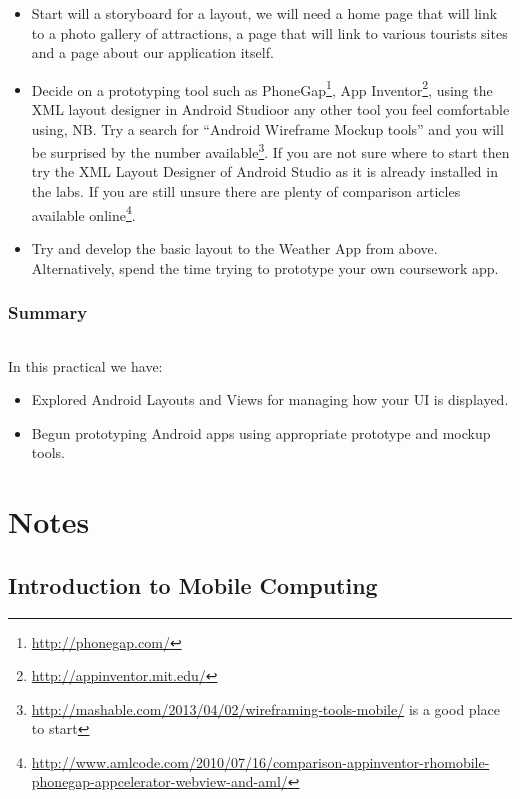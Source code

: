 \documentclass[12pt, a4paper, twoside]{book}
\begin{document}
\begin{itemize}
\item Start will a storyboard for a layout, we will need a home page that will link to a photo gallery of attractions, a page that will link to various tourists sites and a page about our application itself.
\item Decide on a prototyping tool such as PhoneGap\footnote{\url{http://phonegap.com/}}, App Inventor\footnote{\url{http://appinventor.mit.edu/}}, using the XML layout designer in Android Studioor any other tool you feel comfortable using, NB. Try a search for ``Android Wireframe Mockup tools'' and you will be surprised by the number available\footnote{\url{http://mashable.com/2013/04/02/wireframing-tools-mobile/} is a good place to start}. If you are not sure where to start then try the XML Layout Designer of Android Studio as it is already installed in the labs. If you are still unsure there are plenty of comparison articles available online\footnote{\url{http://www.amlcode.com/2010/07/16/comparison-appinventor-rhomobile-phonegap-appcelerator-webview-and-aml/}}.
\item Try and develop the basic layout to the Weather App from above. Alternatively,  spend the time trying to prototype your own coursework app.
\end{itemize}

\section{Summary}
\paragraph{} In this practical we have: 

\begin{itemize}
\item Explored Android Layouts and Views for managing how your UI is displayed.
\item Begun prototyping Android apps using appropriate prototype and mockup tools.
\end{itemize}


\part{Notes}
\chapter{Introduction to Mobile Computing} 
\end{document}
